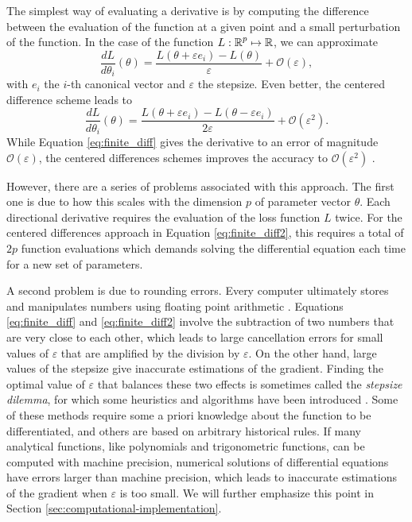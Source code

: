 The simplest way of evaluating a derivative is by computing the difference between the evaluation of the function at a given point and a small perturbation of the function. 
In the case of the function $L : \operatorname{\mathbb{R}}^p \mapsto \operatorname{\mathbb{R}}$, we can approximate
\begin{equation}
 \frac{dL}{d\theta_i} (\theta) = \frac{L(\theta + \varepsilon e_i ) - L(\theta)}{\varepsilon} + \mathcal O (\varepsilon),
 \label{eq:finite_diff}
\end{equation}
with $e_i$ the $i$-th canonical vector and $\varepsilon$ the stepsize. 
Even better, the centered difference scheme leads to
\begin{equation}
 \frac{dL}{d\theta_i} (\theta) 
 =
 \frac{L(\theta + \varepsilon e_i ) - L(\theta - \varepsilon e_i)}{2\varepsilon}
 + \mathcal O (\varepsilon^2).
 \label{eq:finite_diff2}
\end{equation}
While Equation \eqref{eq:finite_diff} gives the derivative to an error of magnitude $\mathcal O (\varepsilon)$, the centered differences schemes improves the accuracy to $\mathcal O (\varepsilon^2)$ \cite{ascher2008-numerical-methods}. 
 
However, there are a series of problems associated with this approach.
The first one is due to how this scales with the dimension $p$ of parameter vector $\theta$.
Each directional derivative requires the evaluation of the loss function $L$ twice.
For the centered differences approach in Equation \eqref{eq:finite_diff2}, this requires a total of $2p$ function evaluations which demands solving the differential equation each time for a new set of parameters.

A second problem is due to rounding errors.
Every computer ultimately stores and manipulates numbers using floating point arithmetic \cite{Goldberg_1991_floatingpoint}. 
Equations \eqref{eq:finite_diff} and \eqref{eq:finite_diff2} involve the subtraction of two numbers that are very close to each other, which leads to large cancellation errors for small values of $\varepsilon$ that are amplified by the division by $\varepsilon$.
On the other hand, large values of the stepsize give inaccurate estimations of the gradient. 
Finding the optimal value of $\varepsilon$ that balances these two effects is sometimes called the \textit{stepsize dilemma}, for which some heuristics and algorithms have been introduced \cite{mathur2012stepsize-finitediff, BARTON_1992_finite_diff, SUNDIALS-hindmarsh2005sundials}. 
Some of these methods require some a priori knowledge about the function to be differentiated, and others are based on arbitrary historical rules. 
If many analytical functions, like polynomials and trigonometric functions, can be computed with machine precision, numerical solutions of differential equations have errors larger than machine precision, which leads to inaccurate estimations of the gradient when $\varepsilon$ is too small. 
We will further emphasize this point in Section \ref{sec:computational-implementation}.

